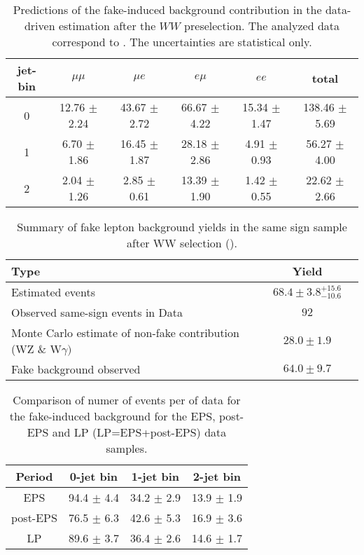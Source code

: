 \begin{table}[!htbp]
\begin{center}
\begin{tabular}{c c c c c c} 
\hline
jet-bin &	 $\mu\mu$ &	 $\mu e$ &	 $e\mu$ &	 $ee$ &	 total \\ 
\hline
0 &	 12.76 $\pm$ 2.24 &	 43.67 $\pm$ 2.72 &	 66.67 $\pm$ 4.22 &	 15.34 $\pm$ 1.47 &	 138.46 $\pm$ 5.69 \\
1 &	 6.70 $\pm$ 1.86  &      16.45 $\pm$ 1.87 &      28.18 $\pm$ 2.86 &       4.91 $\pm$ 0.93 &       56.27 $\pm$ 4.00 \\
2 &	 2.04 $\pm$ 1.26  &       2.85 $\pm$ 0.61 &      13.39 $\pm$ 1.90 &       1.42 $\pm$ 0.55 &       22.62 $\pm$ 2.66 \\
\hline
\end{tabular}
\caption{Predictions of the fake-induced background contribution 
in the data-driven estimation after the $WW$ preselection. 
The analyzed data correspond to \lpintlumi.
The uncertainties are statistical only.}
\label{tab:lp_fake_est}
\end{center}
\end{table}

\begin{table}[!htbp]
\begin{center}
\begin{tabular}{|l|c|c|}
\hline
Type                                                             & Yield \\
\hline
Estimated events                                                 &  $68.4\pm3.8^{+15.6}_{-10.6}$  \\
\hline
Observed same-sign events in Data                                &  $92$        \\
Monte Carlo estimate of non-fake contribution (WZ \& W$\gamma)$  & $28.0\pm1.9$ \\
Fake background observed                                         & $64.0\pm9.7$ \\
\hline
\end{tabular}
\caption{Summary of fake lepton background yields in the same sign sample after WW selection (\lpintlumi). }
\label{tab:lp_FakeLeptonBkgPrediction_SameSignSample}
\end{center}
\end{table}

\begin{table}[!htbp]
\begin{center}
\begin{tabular}{c c c c} 
\hline
Period & 0-jet bin & 1-jet bin & 2-jet bin \\ 
\hline
EPS      & 94.4 $\pm$ 4.4 & 34.2 $\pm$ 2.9 & 13.9 $\pm$ 1.9 \\
post-EPS & 76.5 $\pm$ 6.3 & 42.6 $\pm$ 5.3 & 16.9 $\pm$ 3.6 \\
LP       & 89.6 $\pm$ 3.7 & 36.4 $\pm$ 2.6 & 14.6 $\pm$ 1.7 \\
\hline
\end{tabular}
\caption{Comparison of numer of events per \ifb of data for the fake-induced background for the EPS, post-EPS and LP (LP=EPS+post-EPS) data samples.}
\label{tab:lp_periods_fake}
\end{center}
\end{table}

